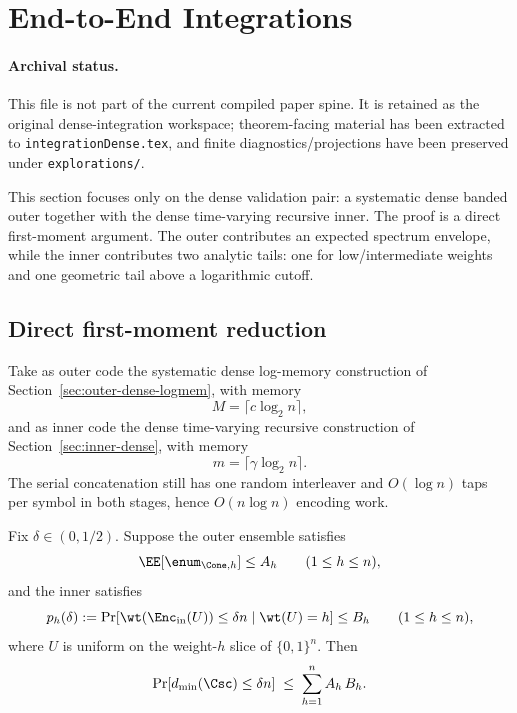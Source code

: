 
\section{End-to-End Integrations}
\label{sec:integrations}

\paragraph{Archival status.}
This file is not part of the current compiled paper spine. It is retained as
the original dense-integration workspace; theorem-facing material has been
extracted to \texttt{integrationDense.tex}, and finite diagnostics/projections
have been preserved under \texttt{explorations/}.

This section focuses only on the dense validation pair:
a systematic dense banded outer together with the dense time-varying recursive inner.
The proof is a direct first-moment argument.
The outer contributes an expected spectrum envelope, while the inner contributes two analytic tails:
one for low/intermediate weights and one geometric tail above a logarithmic cutoff.

\subsection{Direct first-moment reduction}
\label{sec:integration-dense-dense}

Take as outer code the systematic dense log-memory construction of
Section~\ref{sec:outer-dense-logmem}, with memory
\[
M=\lceil c\log_2 n\rceil,
\]
and as inner code the dense time-varying recursive construction of
Section~\ref{sec:inner-dense}, with memory
\[
m=\lceil \gamma \log_2 n\rceil.
\]
The serial concatenation still has one random interleaver and \(O(\log n)\) taps per symbol in both stages,
hence \(O(n\log n)\) encoding work.

\begin{theorem}
\label{thm:dense-dense-direct-first-moment}
Fix \(\delta\in(0,1/2)\).
Suppose the outer ensemble satisfies
\[
\EE[\enum_{\Cone,h}] \le A_h
\qquad (1\le h\le n),
\]
and the inner satisfies
\[
p_h(\delta)
:=
\Pr[\wt(\Enc_{\mathrm{in}}(U))\le \delta n\mid \wt(U)=h]
\le B_h
\qquad (1\le h\le n),
\]
where \(U\) is uniform on the weight-\(h\) slice of \(\{0,1\}^n\).
Then
\begin{equation}
\label{eq:dense-dense-direct-first-moment}
\Pr[d_{\min}(\Csc)\le \delta n]
\;\le\;
\sum_{h=1}^{n} A_h\,B_h.
\end{equation}
\end{theorem}

